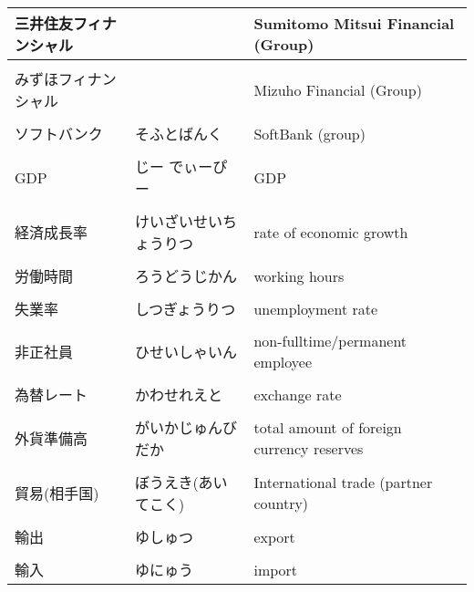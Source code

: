 \documentclass{article}
\begin{document}
\begin{tabular}{ l | l | p{7.5cm} }
三井住友フィナンシャル && Sumitomo Mitsui Financial (Group) \\ \hline \\[-1em]
みずほフィナンシャル && Mizuho Financial (Group) \\ \hline \\[-1em]
ソフトバンク & そふとばんく　& SoftBank (group) \\ \hline \\[-1em]
GDP & じー でぃーぴー & GDP \\ \hline \\[-1em]
経済成長率 & けいざいせいちょうりつ & rate of economic growth \\ \hline \\[-1em]
労働時間 & ろうどうじかん & working hours \\ \hline \\[-1em]
失業率 & しつぎょうりつ & unemployment rate \\ \hline \\[-1em]
非正社員 & ひせいしゃいん & non-fulltime/permanent employee\\ \hline \\[-1em]
為替レート & かわせれえと & exchange rate \\ \hline \\[-1em]
外貨準備高 & がいかじゅんびだか & total amount of foreign currency reserves \\ \hline \\[-1em]
貿易(相手国) & ぼうえき(あいてこく) & International trade (partner country)\\ \hline \\[-1em]
輸出 & ゆしゅつ & export \\ \hline \\[-1em]
輸入 & ゆにゅう & import \\ %
\end{tabular}
\end{document}
